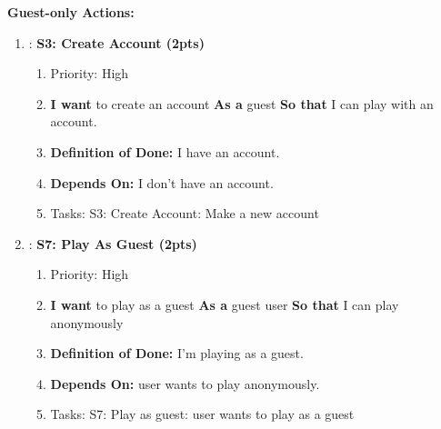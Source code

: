 \textbf{Guest-only Actions:}
\begin{enumerate}[nosep]

    \item: \textbf{S3: Create Account (2pts)}
    \begin{enumerate}[nosep]
        \item Priority: High
        \item \textbf{I want} to create an account \textbf{As a} guest  \textbf{So that} I can play with an account.
        \item \textbf{Definition of Done:} I have an account.
        \item \textbf{Depends On:} I don't have an account.
        \item Tasks: S3: Create Account: Make a new account
    \end{enumerate}

    \item: \textbf{S7: Play As Guest (2pts)}
    \begin{enumerate}[nosep]
        \item Priority: High
        \item \textbf{I want} to play as a guest \textbf{As a} guest user \textbf{So that} I can play anonymously
        \item \textbf{Definition of Done:} I'm playing as a guest.
        \item \textbf{Depends On:} user wants to play anonymously.
        \item Tasks: S7: Play as guest: user wants to play as a guest
    \end{enumerate}
\end{enumerate}

